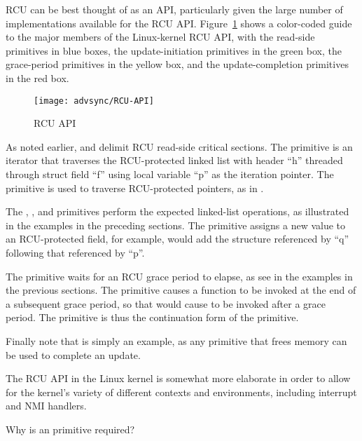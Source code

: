 RCU can be best thought of as an API, particularly given the large number
of implementations available for the RCU API.
Figure~\ref{fig:advsync:RCU API}
shows a color-coded guide to the major members of the Linux-kernel
RCU API, with the read-side primitives in blue boxes, the update-initiation
primitives in the green box, the grace-period primitives in the yellow box,
and the update-completion primitives in the red box.

\begin{figure}[htb]
\centering
\texttt{[image: advsync/RCU-API]}
\caption{RCU API}
\label{fig:advsync:RCU API}
\end{figure}

As noted earlier,  and 
delimit RCU read-side critical sections.
The  primitive is an iterator that
traverses the RCU-protected linked list with header ``h'' threaded
through struct field ``f'' using
local variable ``p'' as the iteration pointer.
The  primitive is used to traverse RCU-protected
pointers, as in .

The , , and
 primitives perform the expected linked-list
operations, as illustrated in the examples in the preceding sections.
The  primitive assigns a new value to an
RCU-protected field, for example, 
would add the structure referenced by ``q'' following that referenced
by ``p''.

The  primitive waits for an RCU grace period
to elapse, as see in the examples in the previous sections.
The  primitive causes a function to be invoked
at the end of a subsequent grace period, so that 
would cause  to be invoked after a grace period.
The  primitive is thus the continuation form of the
 primitive.

Finally note that  is simply an example, as any primitive
that frees memory can be used to complete an update.

The RCU API in the Linux kernel is somewhat more elaborate in order to
allow for the kernel's variety of different contexts and environments,
including interrupt and NMI handlers.

\QuickQuiz{}
	Why is an  primitive required?
 \QuickQuizEnd

